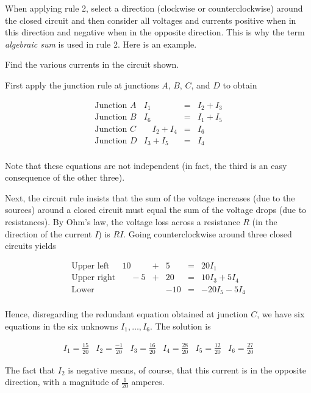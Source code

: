 \documentclass{ximera}
\begin{document}
When applying rule 2, select a direction (clockwise or counterclockwise) around the closed circuit and then consider all voltages and currents positive when in this direction
and negative when in the opposite direction. This is why the term \textit{algebraic sum} is used in rule 2. Here is an example.

\begin{example}\label{001817}

Find the various currents in the circuit shown.

\begin{explanation}
%	
  First apply the junction rule at junctions $A$, $B$, $C$, and $D$ to obtain

$$
\begin{array}{lrcl}
	\mbox{Junction } A & I_1 & = & I_2 + I_3 \\
	\mbox{Junction } B & I_6 & = & I_1 + I_5 \\
	\mbox{Junction } C & \quad I_2 + I_4 & = & I_6 \\
	\mbox{Junction } D & I_3 + I_5 & = & I_4 \\
\end{array}$$

Note that these equations are not independent (in fact, the third is an easy consequence of the other three).

Next, the circuit rule insists that the sum of the voltage increases (due to the sources) around a closed circuit must equal the sum of the voltage drops (due to resistances). By Ohm's law, the voltage loss across a resistance $R$ (in the direction of the current $I$) is $RI$. Going counterclockwise around three closed circuits yields

$$\begin{array}{lrrrcl}
	\mbox{Upper left} &  10 & + & 5 & = & 20I_1 \\
	\mbox{Upper right} & \quad  -5 & +& 20 & = & 10I_3 + 5I_4 \\
	\mbox{Lower} & & &-10 & = & -20I_5 - 5I_4 \\
\end{array}$$

Hence, disregarding the redundant equation obtained at junction $C$, we have six equations in the six unknowns $I_1, \dots, I_6$. The solution is

$$\begin{array}{cccccc}
	I_1 = \frac{15}{20} & I_2 = \frac{-1}{20} &
	I_3 = \frac{16}{20} & I_4 = \frac{28}{20} & I_5 = \frac{12}{20} & I_6 = \frac{27}{20}
    \end{array}$$

The fact that $I_2$ is negative means, of course, that this current is in the opposite direction, with a magnitude of $\frac{1}{20}$ amperes.

\end{explanation}

\end{example}
\end{document}
